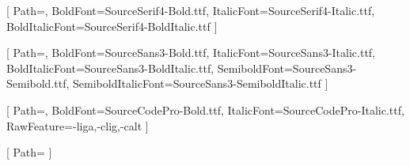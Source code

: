 

\usepackage{fontspec}

\setmainfont{SourceSerif4-Regular.ttf}[
  Path=\chrisdocfontpath,
  BoldFont=SourceSerif4-Bold.ttf,
  ItalicFont=SourceSerif4-Italic.ttf,
  BoldItalicFont=SourceSerif4-BoldItalic.ttf
]

\setsansfont{SourceSans3-Regular.ttf}[
  Path=\chrisdocfontpath,
  BoldFont=SourceSans3-Bold.ttf,
  ItalicFont=SourceSans3-Italic.ttf,
  BoldItalicFont=SourceSans3-BoldItalic.ttf,
  SemiboldFont=SourceSans3-Semibold.ttf,
  SemiboldItalicFont=SourceSans3-SemiboldItalic.ttf
]


\setmonofont{SourceCodePro-Regular.ttf}[
  Path=\chrisdocfontpath,
  BoldFont=SourceCodePro-Bold.ttf,
  ItalicFont=SourceCodePro-Italic.ttf,
  RawFeature={-liga,-clig,-calt}
]

\usepackage{unicode-math}
[
Path=\chrisdocfontpath
]



\fontsize{12pt}{15.6pt}\selectfont

\usepackage{fontawesome5}

\usepackage[hang]{footmisc}      %
\setlength{\footnotemargin}{.5em} %

\setlength{\footnotesep}{0.5\baselineskip} %

\setlength{\skip\footins}{6pt plus 2pt minus 1pt} %
\renewcommand{\footnotelayout}{\setlength{\parskip}{0pt}}

\usepackage{etoolbox}
\makeatletter
\let\fm@makefntext\@makefntext
\patchcmd\maketitle{\if@twocolumn}{\let\@makefntext\fm@makefntext\if@twocolumn}{}{\fail}
\makeatother

